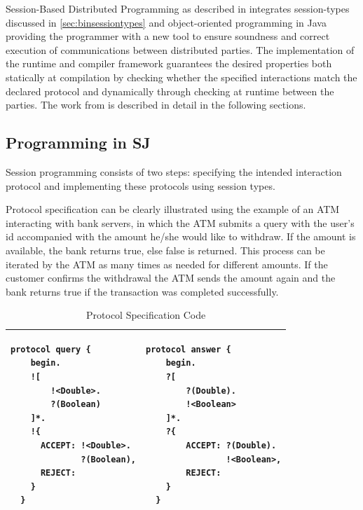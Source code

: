	
Session-Based Distributed Programming as described in \cite{sessionbased_programming} integrates session-types discussed in \autoref{sec:binsessiontypes} and object-oriented programming in Java providing the programmer with a new tool to ensure soundness and correct execution of communications between distributed parties. The implementation of the runtime and compiler framework guarantees the desired properties both statically at compilation by checking whether the specified interactions match the declared protocol and dynamically through checking at runtime between the parties. The work from \cite{sessionbased_programming} is described in detail in the following sections.

\subsection{Programming in SJ}
\label{subsec:sjprogram}

Session programming consists of two steps: specifying the intended interaction protocol and implementing these protocols using session types.

Protocol specification can be clearly illustrated using the example of an ATM interacting with bank servers, in which the ATM submits a query with the user's id accompanied with the amount he/she would like to withdraw. If the amount is available, the bank returns true, else false is returned. This process can be iterated by the ATM as many times as needed for different amounts. If the customer confirms the withdrawal the ATM sends the amount again and the bank returns true if the transaction was completed successfully.

\begin{table}[H]
\center
\caption{Protocol Specification Code}
\begin{tabular}{|l|l|}
\hline

  \begin{lstlisting}[basicstyle=\LISTINGSTYLE]
  protocol query {
    begin.
    ![
        !<Double>.
        ?(Boolean)
    ]*.
    !{
      ACCEPT: !<Double>.
              ?(Boolean),
      REJECT:
    }
  }
  \end{lstlisting}
  &
  \begin{lstlisting}[basicstyle=\LISTINGSTYLE]
  protocol answer {
    begin.
    ?[
        ?(Double).
        !<Boolean>
    ]*.
    ?{
        ACCEPT: ?(Double).
                !<Boolean>,
        REJECT:
    }
  }
  \end{lstlisting}\\
  \hline
  
\end{tabular}
\label{CODEprotocol}
\end{table}

